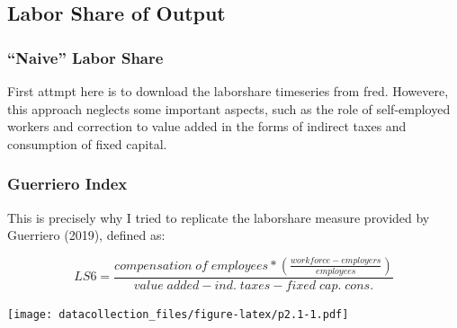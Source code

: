 \documentclass[
]{article}
\begin{document}
\hypertarget{labor-share-of-output}{%
\subsection{Labor Share of Output}\label{labor-share-of-output}}

\hypertarget{naive-labor-share}{%
\subsubsection{``Naive'' Labor Share}\label{naive-labor-share}}

First attmpt here is to download the laborshare timeseries from fred.
Howevere, this approach neglects some important aspects, such as the
role of self-employed workers and correction to value added in the forms
of indirect taxes and consumption of fixed capital.

\hypertarget{guerriero-index}{%
\subsubsection{Guerriero Index}\label{guerriero-index}}

This is precisely why I tried to replicate the laborshare measure
provided by Guerriero (2019), defined as:

\[LS6 = \frac{compensation\;of\;employees * 
\left(\frac{workforce-employers}{employees}\right)}
{value\;added-ind.\;taxes-fixed\;cap.\;cons.}\]

\texttt{[image: datacollection\_files/figure-latex/p2.1-1.pdf]}
\end{document}

